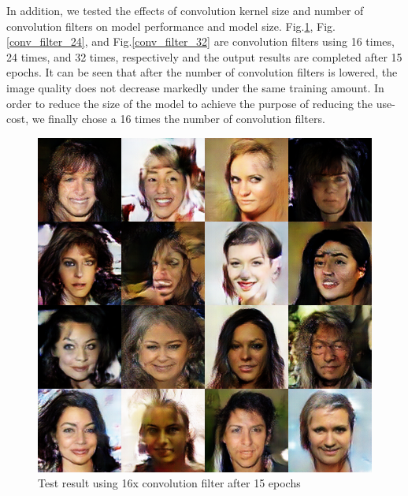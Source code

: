 In addition, we tested the effects of convolution kernel size and number of convolution filters on model performance and model size.
Fig.\ref{conv_filter_16}, Fig.\ref{conv_filter_24}, and Fig.\ref{conv_filter_32} are convolution filters using 16 times, 24 times, and 32 times, respectively and the output results are completed after 15 epochs.
It can be seen that after the number of convolution filters is lowered, the image quality does not decrease markedly under the same training amount.
In order to reduce the size of the model to achieve the purpose of reducing the use-cost, we finally chose a 16 times the number of convolution filters.

\begin{figure}
    \begin{minipage}[t]{0.48\linewidth}
        \centering
        \includegraphics[width=\textwidth]{figures/result_conv_filter_16.png}
        \caption{Test result using 16x convolution filter after 15 epochs}
        \label{conv_filter_16}
    \end{minipage}
        \hfill
    \begin{minipage}[t]{0.48\linewidth}
        \centering

\end{minipage}
\end{figure}
